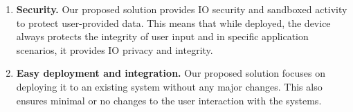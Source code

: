 \begin{enumerate}
   \item \textbf{Security.} Our proposed solution provides IO security and sandboxed activity to protect user-provided data. This means that while deployed, the device always protects the integrity of user input and in specific application scenarios, it provides IO privacy and integrity.
  \item \textbf{Easy deployment and integration.} Our proposed solution focuses on deploying it to an existing system without any major changes. This also ensures minimal or no changes to the user interaction with the systems.

\end{enumerate}
